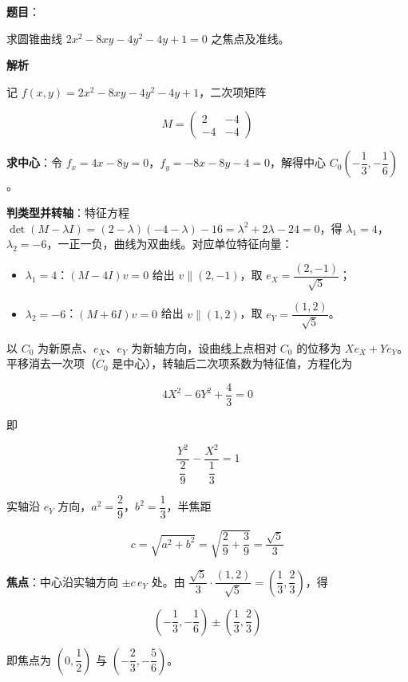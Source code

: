 \begin{answer}

\textbf{题目}：

求圆锥曲线 $2x^2-8xy-4y^2-4y+1=0$ 之焦点及准线。

\textbf{解析}

记 $f(x,y)=2x^2-8xy-4y^2-4y+1$，二次项矩阵

\nopagebreak[4]
\[
M=\begin{pmatrix}2&-4\\-4&-4\end{pmatrix}
\]

\textbf{求中心}：令 $f_x=4x-8y=0$，$f_y=-8x-8y-4=0$，解得中心 $C_0\left(-\dfrac13,-\dfrac16\right)$。

\textbf{判类型并转轴}：特征方程 $\det(M-\lambda I)=(2-\lambda)(-4-\lambda)-16=\lambda^2+2\lambda-24=0$，得 $\lambda_1=4$，$\lambda_2=-6$，一正一负，曲线为双曲线。对应单位特征向量：

\begin{itemize}
\item $\lambda_1=4$：$(M-4I)v=0$ 给出 $v\parallel(2,-1)$，取 $e_X=\dfrac{(2,-1)}{\sqrt5}$；
\item $\lambda_2=-6$：$(M+6I)v=0$ 给出 $v\parallel(1,2)$，取 $e_Y=\dfrac{(1,2)}{\sqrt5}$。
\end{itemize}

以 $C_0$ 为新原点、$e_X$、$e_Y$ 为新轴方向，设曲线上点相对 $C_0$ 的位移为 $Xe_X+Ye_Y$。平移消去一次项（$C_0$ 是中心），转轴后二次项系数为特征值，方程化为

\nopagebreak[4]
\[
4X^2-6Y^2+\frac43=0
\]

即

\nopagebreak[4]
\[
\frac{Y^2}{\;\dfrac29\;}-\frac{X^2}{\;\dfrac13\;}=1
\]

实轴沿 $e_Y$ 方向，$a^2=\dfrac29$，$b^2=\dfrac13$，半焦距

\nopagebreak[4]
\[
c=\sqrt{a^2+b^2}=\sqrt{\frac29+\frac39}=\frac{\sqrt5}3
\]

\textbf{焦点}：中心沿实轴方向 $\pm c\,e_Y$ 处。由 $\dfrac{\sqrt5}3\cdot\dfrac{(1,2)}{\sqrt5}=\left(\dfrac13,\dfrac23\right)$，得

\nopagebreak[4]
\[
\left(-\frac13,-\frac16\right)\pm\left(\frac13,\frac23\right)
\]

即焦点为 $\left(0,\dfrac12\right)$ 与 $\left(-\dfrac23,-\dfrac56\right)$。


\end{answer}
